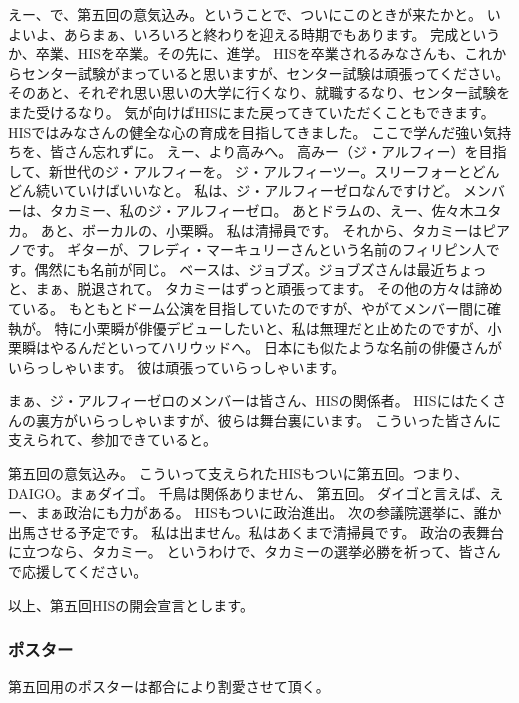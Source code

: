 えー、で、第五回の意気込み。ということで、ついにこのときが来たかと。
いよいよ、あらまぁ、いろいろと終わりを迎える時期でもあります。
完成というか、卒業、HISを卒業。その先に、進学。
HISを卒業されるみなさんも、これからセンター試験がまっていると思いますが、センター試験は頑張ってください。
そのあと、それぞれ思い思いの大学に行くなり、就職するなり、センター試験をまた受けるなり。
気が向けばHISにまた戻ってきていただくこともできます。
HISではみなさんの健全な心の育成を目指してきました。
ここで学んだ強い気持ちを、皆さん忘れずに。
えー、より高みへ。
高みー（ジ・アルフィー）を目指して、新世代のジ・アルフィーを。
ジ・アルフィーツー。スリーフォーとどんどん続いていけばいいなと。
私は、ジ・アルフィーゼロなんですけど。
メンバーは、タカミー、私のジ・アルフィーゼロ。
あとドラムの、えー、佐々木ユタカ。
あと、ボーカルの、小栗瞬。
私は清掃員です。
それから、タカミーはピアノです。
ギターが、フレディ・マーキュリーさんという名前のフィリピン人です。偶然にも名前が同じ。
ベースは、ジョブズ。ジョブズさんは最近ちょっと、まぁ、脱退されて。
タカミーはずっと頑張ってます。
その他の方々は諦めている。
もともとドーム公演を目指していたのですが、やがてメンバー間に確執が。
特に小栗瞬が俳優デビューしたいと、私は無理だと止めたのですが、小栗瞬はやるんだといってハリウッドへ。
日本にも似たような名前の俳優さんがいらっしゃいます。
彼は頑張っていらっしゃいます。

まぁ、ジ・アルフィーゼロのメンバーは皆さん、HISの関係者。
HISにはたくさんの裏方がいらっしゃいますが、彼らは舞台裏にいます。
こういった皆さんに支えられて、参加できていると。

第五回の意気込み。
こういって支えられたHISもついに第五回。つまり、DAIGO。まぁダイゴ。
千鳥は関係ありません、
第五回。
ダイゴと言えば、えー、まぁ政治にも力がある。
HISもついに政治進出。
次の参議院選挙に、誰か出馬させる予定です。
私は出ません。私はあくまで清掃員です。
政治の表舞台に立つなら、タカミー。
というわけで、タカミーの選挙必勝を祈って、皆さんで応援してください。

以上、第五回HISの開会宣言とします。

\subsubsection{ポスター}
第五回用のポスターは都合により割愛させて頂く。


